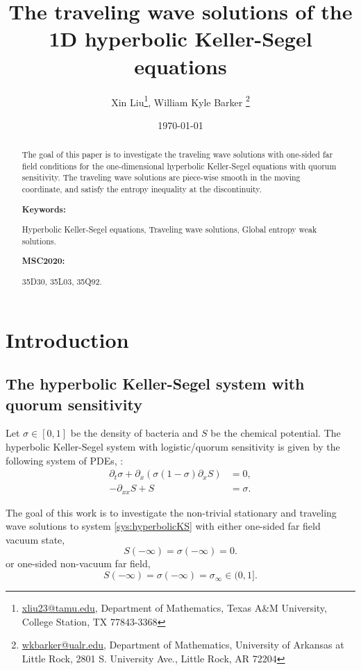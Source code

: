 \documentclass[12pt]{article}
\title{The traveling wave solutions of the 1D hyperbolic Keller-Segel equations}
\author{Xin Liu\footnote{\href{mailto:xliu23@tamu.edu}{xliu23@tamu.edu}, Department of Mathematics, Texas A\&M University, College Station, TX 77843-3368}, William Kyle Barker \footnote{\href{mailto:wkbarker@ualr.edu}{wkbarker@ualr.edu}, Department of Mathematics, University of Arkansas at Little Rock, 2801 S. University Ave., Little Rock, AR 72204}}
\date{\today}
\theoremstyle{definition}
\theoremstyle{remark}
\numberwithin{equation}{section}
\begin{document}
\maketitle

\begin{abstract}
The goal of this paper is to investigate the traveling wave solutions with one-sided far field conditions for the one-dimensional hyperbolic Keller-Segel equations with quorum sensitivity. The traveling wave solutions are piece-wise smooth in the moving coordinate, and satisfy the entropy inequality at the discontinuity.

\smallskip 

{\par\noindent\bf Keywords:} Hyperbolic Keller-Segel equations, Traveling wave solutions, Global entropy weak solutions.

{\par\noindent\bf MSC2020:} 35D30, 35L03, 35Q92.
\end{abstract}

\section{Introduction}

\subsection{The hyperbolic Keller-Segel system with quorum sensitivity}

Let $ \sigma \in [0,1] $ be the density of bacteria
and $ S $ be the chemical potential. The hyperbolic Keller-Segel system with logistic/quorum sensitivity is given by the following system of PDEs, \cite{perthameExistenceSolutionsHyperbolic2009,leeThresholdShockFormation2015}:
\begin{subequations}
    \label{sys:hyperbolicKS}
    \begin{align}
        \label{eq:continuity} \partial_t \sigma + \partial_x (\sigma (1-\sigma) \partial_x S) & = 0, \\
        \label{eq:potential} - \partial_{xx} S + S & = \sigma.
    \end{align}
\end{subequations}

The goal of this work is to investigate the non-trivial stationary and traveling wave solutions to system \eqref{sys:hyperbolicKS} with either one-sided far field vacuum state,
\begin{equation}
    \label{far-field-vacuum}
    S (-\infty) = \sigma(-\infty) = 0. 
\end{equation}
or one-sided non-vacuum far field,
\begin{equation}
    \label{non-vacuum-far-field}
    S(-\infty) = \sigma(-\infty) = \sigma_\infty \in (0,1]. 
\end{equation}
\end{document}
